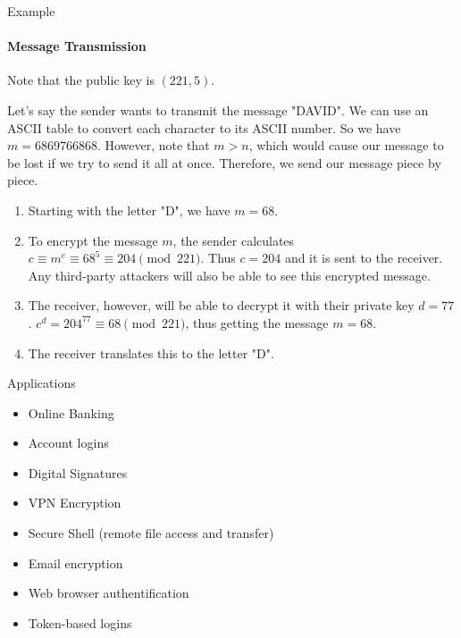 \documentclass{beamer}
\begin{document}
\begin{frame}{Example}
    \framesubtitle{Message Transmission}
    Note that the public key is $(221, 5)$.
    
    Let's say the sender wants to transmit the message "DAVID". We can use an ASCII table to convert each character to its ASCII number. So we have $m = 6869766868$. However, note that $m > n$, which would cause our message to be lost if we try to send it all at once. Therefore, we send our message piece by piece.

    \begin{enumerate}
        \item Starting with the letter "D", we have $m = 68$.
        \item To encrypt the message $m$, the sender calculates $c \equiv m^e \equiv 68^5 \equiv 204 \pmod{221}$. Thus $c = 204$ and it is sent to the receiver. Any third-party attackers will also be able to see this encrypted message.
        \item The receiver, however, will be able to decrypt it with their private key $d = 77$. $c^{d} = 204^{77} \equiv 68 \pmod{221}$, thus getting the message $m = 68$.
        \item The receiver translates this to the letter "D".
    \end{enumerate}
\end{frame}

\begin{frame}{Applications}
    \begin{itemize}
        \item Online Banking
        \item Account logins
        \item Digital Signatures
        \item VPN Encryption
        \item Secure Shell (remote file access and transfer)
        \item Email encryption
        \item Web browser authentification
        \item Token-based logins
    \end{itemize}
\end{frame}
\end{document}
